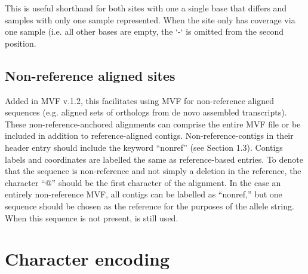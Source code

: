 \documentclass[letterpaper,11pt,english]{sphinxmanual}
\begin{document}
This is useful shorthand for both sites with one a single base that differs and samples with only one sample represented.  When the site only has coverage via one sample (i.e. all other bases are empty, the ‘-‘ is omitted from the second position.
\begin{quote}

\end{quote}


\subsection{Non-reference aligned sites}
\label{\detokenize{mvf_spec:non-reference-aligned-sites}}
Added in MVF v.1.2, this facilitates using MVF for non-reference aligned sequences (e.g. aligned sets of orthologs from de novo assembled transcripts). These non-reference-anchored alignments can comprise the entire MVF file or be included in addition to reference-aligned contigs. Non-reference-contigs in their header entry should include the keyword “nonref” (see Section 1.3). Contigs labels and coordinates are labelled the same as reference-based entries. To denote that the sequence is non-reference and not simply a deletion in the reference, the character “@” should be the first character of the alignment.  In the case an entirely non-reference MVF, all contigs can be labelled as “nonref,” but one sequence should be chosen as the reference for the purposes of the allele
string.  When this sequence is not present,  is still used.
\begin{quote}

\end{quote}


\section{Character encoding}
\label{\detokenize{mvf_spec:character-encoding}}
\end{document}

